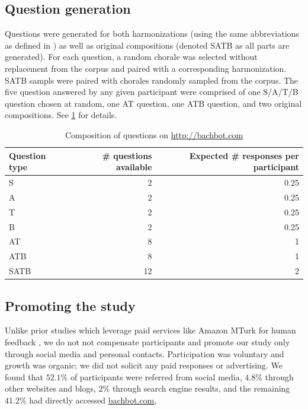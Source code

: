 \subsection{Question generation}

Questions were generated for both harmonizations (using the same abbreviations
as defined in ) as well as original compositions (denoted SATB as all parts
are generated). For each question, a random chorale was selected without
replacement from the corpus and paired with a corresponding harmonization.
SATB sampls were paired with chorales randomly sampled from the corpus. The
five question answered by any given participant were comprised of one S/A/T/B
question chosen at random, one AT question, one ATB question, and two original
compositions. See \cref{tab:bachbot-com-question-distribtion} for details.

\begin{table}[tb]
  \centering
  \begin{tabular}{lrr}
    \toprule
    Question type & \# questions available & Expected \# responses per participant \\
    \midrule
    S        & 2  & 0.25 \\
    A        & 2  & 0.25 \\
    T        & 2  & 0.25 \\
    B        & 2  & 0.25 \\
    AT       & 8  & 1 \\
    ATB      & 8  & 1 \\
    SATB     & 12 & 2 \\
    \bottomrule
  \end{tabular}
  \caption{Composition of questions on \url{http://bachbot.com}}
  \label{tab:bachbot-com-question-distribtion}
\end{table}

\subsection{Promoting the study}

Unlike prior studies which leverage paid services like Amazon MTurk for human
feedback \cite{quick2014kulitta}, we do not not compensate participants and
promote our study only through social media and personal contacts.
Participation was voluntary and growth was organic; we did not solicit any paid
responses or advertising. We found that $52.1\%$ of participants
were referred from social media, $4.8\%$ through other websites and blogs,
$2\%$ through search engine results, and the remaining $41.2\%$ had directly
accessed \url{bachbot.com},

